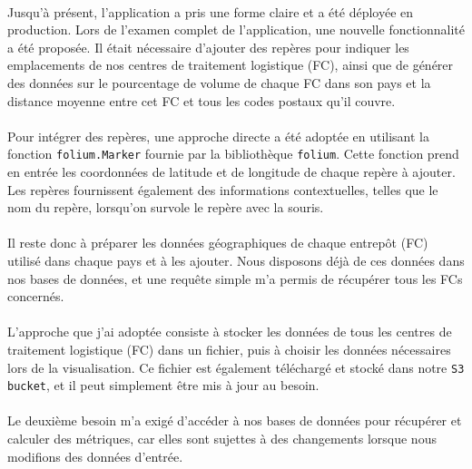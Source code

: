 \paragraph{}
\vspace{-2em}
Jusqu'à présent, l'application a pris une forme claire et a été déployée en production. Lors de l'examen complet de l'application, une nouvelle fonctionnalité a été proposée. Il était nécessaire d'ajouter des repères pour indiquer les emplacements de nos centres de traitement logistique (FC), ainsi que de générer des données sur le pourcentage de volume de chaque FC dans son pays et la distance moyenne entre cet FC et tous les codes postaux qu'il couvre.
\paragraph{}
\vspace{-2em}
Pour intégrer des repères, une approche directe a été adoptée en utilisant la fonction \texttt{folium.Marker} fournie par la bibliothèque \texttt{folium}. Cette fonction prend en entrée les coordonnées de latitude et de longitude de chaque repère à ajouter. Les repères fournissent également des informations contextuelles, telles que le nom du repère, lorsqu'on survole le repère avec la souris.
\paragraph{}
\vspace{-2em}
Il reste donc à préparer les données géographiques de chaque entrepôt (FC) utilisé dans chaque pays et à les ajouter. Nous disposons déjà de ces données dans nos bases de données, et une requête simple m'a permis de récupérer tous les FCs concernés.

\paragraph{}
\vspace{-2em}
L'approche que j'ai adoptée consiste à stocker les données de tous les centres de traitement logistique (FC) dans un fichier, puis à choisir les données nécessaires lors de la visualisation. Ce fichier est également téléchargé et stocké dans notre \texttt{S3 bucket}, et il peut simplement être mis à jour au besoin.

\paragraph{}
\vspace{-2em}
Le deuxième besoin m'a exigé d'accéder à nos bases de données pour récupérer et calculer des métriques, car elles sont sujettes à des changements lorsque nous modifions des données d'entrée.

